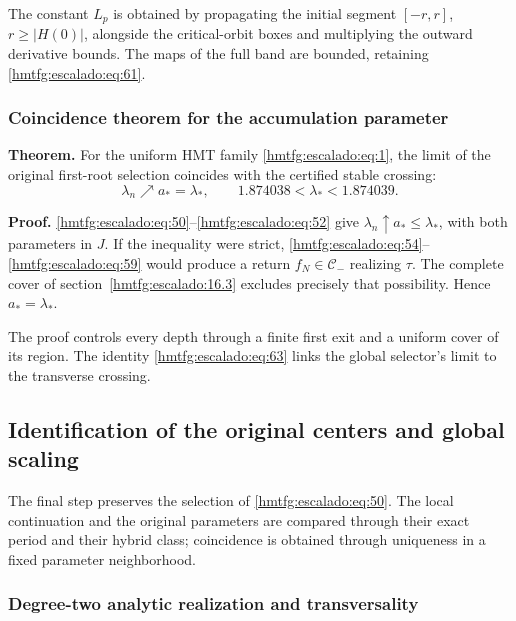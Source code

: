 The constant \(L_p\) is obtained by propagating the initial segment \([-r,r]\), \(r\ge|H(0)|\), alongside the critical-orbit boxes and multiplying the outward derivative bounds. The maps of the full band are bounded, retaining \eqref{hmtfg:escalado:eq:61}.

\subsubsection{Coincidence theorem for the accumulation parameter}
\label{hmtfg:escalado:16.4}

\textbf{Theorem.} For the uniform HMT family \eqref{hmtfg:escalado:eq:1}, the limit of the original first-root selection coincides with the certified stable crossing:
\begin{equation}
\boxed{\lambda_n\nearrow a_*=\lambda_*,
\qquad 1.874038<\lambda_*<1.874039.}
\label{hmtfg:escalado:eq:63}
\end{equation}

\textbf{Proof.} \eqref{hmtfg:escalado:eq:50}–\eqref{hmtfg:escalado:eq:52} give \(\lambda_n\uparrow a_*\le\lambda_*\), with both parameters in \(J\). If the inequality were strict, \eqref{hmtfg:escalado:eq:54}–\eqref{hmtfg:escalado:eq:59} would produce a return \(f_N\in\mathcal C_-\) realizing \(\tau\). The complete cover of section~\ref{hmtfg:escalado:16.3} excludes precisely that possibility. Hence \(a_*=\lambda_*\).

The proof controls every depth through a finite first exit and a uniform cover of its region. The identity \eqref{hmtfg:escalado:eq:63} links the global selector’s limit to the transverse crossing.


\subsection{Identification of the original centers and global scaling}
\label{hmtfg:escalado:17}

The final step preserves the selection of \eqref{hmtfg:escalado:eq:50}. The local continuation and the original parameters are compared through their exact period and their hybrid class; coincidence is obtained through uniqueness in a fixed parameter neighborhood.

\subsubsection{Degree-two analytic realization and transversality}
\label{hmtfg:escalado:17.1}

